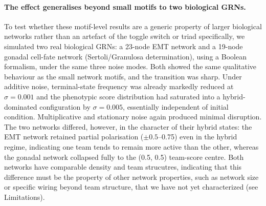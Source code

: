 \documentclass[11pt]{article}
\begin{document}
\paragraph{The effect generalises beyond small motifs to two biological GRNs.}
To test whether these motif-level results are a generic property of larger biological networks rather than an artefact of the toggle switch or triad specifically, we simulated two real biological GRNs: a 23-node EMT network and a 19-node gonadal cell-fate network (Sertoli/Granulosa determination), using a Boolean formalism, under the same three noise modes. Both showed the same qualitative behaviour as the small network motifs, and the transition was sharp. Under additive noise, terminal-state frequency was already markedly reduced at $\sigma = 0.001$ and the phenotypic score distribution had saturated into a hybrid-dominated configuration by $\sigma = 0.005$, essentially independent of initial condition. Multiplicative and stationary noise again produced minimal disruption. The two networks differed, however, in the character of their hybrid states: the EMT network retained partial polarisation ($\pm 0.5$--0.75) even in the hybrid regime, indicating one team tends to remain more active than the other, whereas the gonadal network collapsed fully to the (0.5, 0.5) team-score centre. Both networks have comparable density and team strucutres, indicating that this difference must be the property of other network properties, such as network size or specific wiring beyond team structure, that we have not yet characterized (see Limitations).
\end{document}
